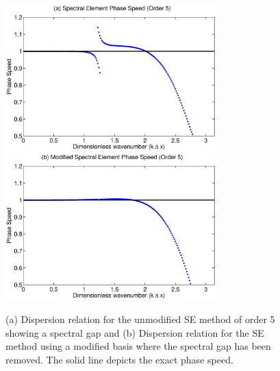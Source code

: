 \documentclass[11pt]{article}
\begin{document}
\begin{figure}
\begin{center}
\includegraphics[width=3.2in]{SE_UnmodifiedDispersion}
\includegraphics[width=3.2in]{SE_ModifiedDispersion}
\end{center}
\caption{(a) Dispersion relation for the unmodified SE method of order 5 showing a spectral gap and (b) Dispersion relation for the SE method using a modified basis where the spectral gap has been removed.  The solid line depicts the exact phase speed.} \label{fig:SEMDispersionGap}
\end{figure}
\end{document}
